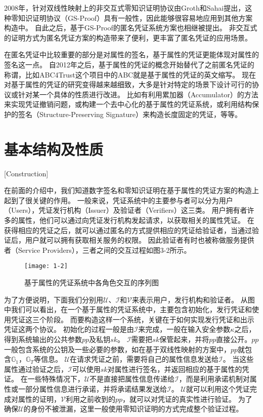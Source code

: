 2008年，针对双线性映射上的非交互式零知识证明协议\cite{groth2008efficient}由Groth和Sahai提出，这种零知识证明协议（GS-Proof）具有一般性，因此能够很容易地应用到其他方案构造中。
自此之后，基于GS-Proof的匿名凭证系统方案也相继被提出\cite{belenkiy2008p,belenkiy2009randomizable}。
非交互式的证明方式为匿名凭证方案的构造带来了便利，更丰富了匿名凭证的应用场景。

在匿名凭证中比较重要的部分是对属性的签名，基于属性的凭证更能体现对属性的签名这一点。
自2012年之后，基于属性的凭证的概念开始替代了之前匿名凭证的称谓\cite{sabouri2012attribute}，比如ABC4Trust这个项目中的ABC就是基于属性的凭证的英文缩写。
现在对基于属性的凭证的研究变得越来越细致，大多是针对特定的场景下设计可行的协议或针对某一个具体的性质进行改进。
比如有利用累加器（Accumulator）的方法来实现凭证撤销问题\cite{camenisch2009accumulator}，或构建一个去中心化的基于属性的凭证系统\cite{garman2014decentralized}，或利用结构保护的签名（Structure-Preserving Signature）来构造长度固定的凭证\cite{fuchsbauer2018structure}，等等。

\section{基本结构及性质}[Construction]

在前面的介绍中，我们知道数字签名和零知识证明在基于属性的凭证方案的构造上起到了很关键的作用。
一般来说，凭证系统中的主要参与者可以分为用户（Users），凭证发行机构（Issuer）及验证者（Verifiers）这三类。
用户拥有者许多的属性，他们可以通过向凭证发行机构发起请求，以获取相关的属性凭证。
在获得相应的凭证之后，就可以通过匿名的方式提供相应的凭证给验证者，当通过验证后，用户就可以拥有获取相关服务的权限。
因此验证者有时也被称做服务提供者（Service Providers），三者之间的交互过程如图3-2所示。

\begin{figure}[h]
\centering
\texttt{[image: 1-2]}
\caption{基于属性的凭证系统中各角色交互的序列图}
\end{figure}

为了方便说明，下面我们分别用$\mathcal{U}$、$\mathcal{I}$和$\mathcal{V}$来表示用户，发行机构和验证者。
从图中我们可以看出，在一个基于属性的凭证系统中，主要包含初始化，发行凭证和使用凭证这三个阶段。
而要构造这样一个系统，关键在于如何实现发行凭证和出示凭证这两个协议。
初始化的过程一般是由$\mathcal{I}$来完成，一般在输入安全参数$\kappa$之后，得到系统输出的公共参数$pp$及私钥$sk$。
$\mathcal{I}$需要把$sk$保管起来，并将$pp$直接公开。$pp$一般包含系统的公钥及一些必要的参数，如在基于双线性映射的方案中，$pp$就包含$\mathbb{G}_1$，$\mathbb{G}_T$等信息。
$\mathcal{U}$在请求凭证之前，需要将自己的属性信息发送给$\mathcal{I}$。
当这些属性通过验证之后，$\mathcal{I}$可以使用$sk$对属性进行签名，并返回相应的基于属性的凭证。
在一些特殊情况下，$\mathcal{U}$不是直接把属性信息传递给$\mathcal{I}$，而是利用承诺机制对属性或一部分属性信息进行承诺，并将承诺结果发送给$\mathcal{I}$。
$\mathcal{U}$就可以利用这个凭证完成对属性的证明，$\mathcal{V}$利用之前收到的$pp$，就可以对凭证的真实性进行验证。
为了确保$\mathcal{U}$的身份不被泄漏，这里一般使用零知识证明的方式完成整个验证过程。

